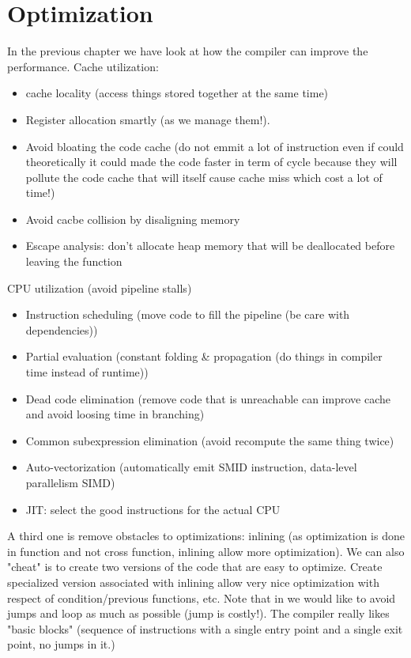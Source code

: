 \chapter{Optimization}
\label{chap:optimization}
In the previous chapter we have look at how the compiler can improve the
performance.
Cache utilization:
\begin{itemize}
    \item cache locality (access things stored
    together at the same time)
    \item Register allocation smartly (as we manage them!).
    \item Avoid bloating the code cache (do not emmit a lot of instruction even
    if could theoretically it could made the code faster in term of cycle
    because they will pollute the code cache that will itself cause cache miss
    which cost a lot of time!)
    \item Avoid cacbe collision by disaligning memory
    \item Escape analysis: don't allocate heap memory that will be deallocated
    before leaving the function
\end{itemize}
CPU utilization (avoid pipeline stalls)
\begin{itemize}
    \item Instruction scheduling (move code to fill the pipeline (be care with
    dependencies))
    \item Partial evaluation (constant folding \& propagation (do things in
    compiler time instead of runtime))
    \item Dead code elimination (remove code that is unreachable can improve
    cache and avoid loosing time in branching)
    \item Common subexpression elimination (avoid recompute the same thing twice)
    \item Auto-vectorization (automatically emit SMID instruction, data-level
    parallelism SIMD) 
    \item JIT: select the good instructions for the actual CPU
\end{itemize}
A third one is remove obstacles to optimizations: inlining (as optimization is
done in function and not cross function, inlining allow more optimization). We
can also "cheat" is to create two versions of the code that are easy to
optimize. Create specialized version associated with inlining allow very nice
optimization with respect of condition/previous functions, etc. Note that in we
would like to avoid jumps and loop as much as possible (jump is costly!). The
compiler really likes "basic blocks" (sequence of instructions with a single
entry point and a single exit point, no jumps in it.)

